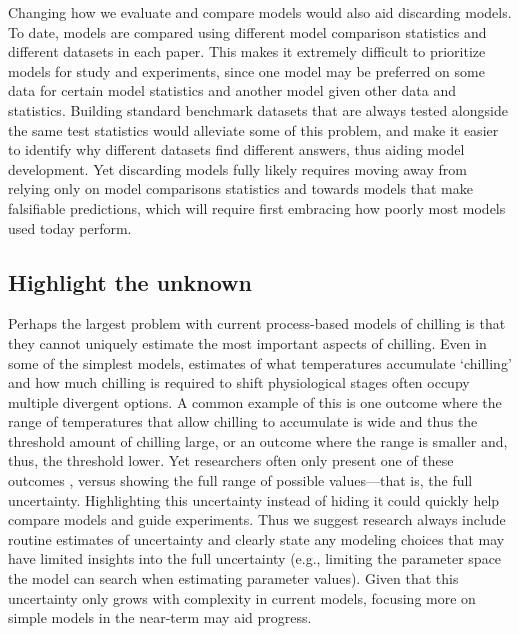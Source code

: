 \documentclass[11pt]{article}
\begin{document}
Changing how we evaluate and compare models would also aid discarding models. To date, models are compared using different model comparison statistics and different datasets in each paper. This makes it extremely difficult to prioritize models for study and experiments, since one model may be preferred on some data for certain model statistics and another model given other data and statistics. Building standard benchmark datasets that are always tested alongside the same test statistics would alleviate some of this problem, and make it easier to identify why different datasets find different answers, thus aiding model development. Yet discarding models fully likely requires moving away from relying only on model comparisons statistics and towards models that make falsifiable predictions, which will require first embracing how poorly most models used today perform. 

\subsection*{Highlight the unknown} 
Perhaps the largest problem with current process-based models of chilling is that they cannot uniquely estimate the most important aspects of chilling. Even in some of the simplest models, estimates of what temperatures accumulate `chilling' and how much chilling is required to shift physiological stages often occupy multiple divergent options. A common example of this is one outcome where the range of temperatures that allow chilling to accumulate is wide and thus the threshold amount of chilling large, or an outcome where the range is smaller and, thus, the threshold lower. Yet researchers often only present one of these outcomes \citep{chuine2016}, versus showing the full range of possible values---that is, the full uncertainty. Highlighting this uncertainty instead of hiding it could quickly help compare models and guide experiments. Thus we suggest research always include routine estimates of uncertainty and clearly state any modeling choices that may have limited insights into the full uncertainty (e.g., limiting the parameter space the model can search when estimating parameter values). Given that this uncertainty only grows with complexity in current models, focusing more on simple models in the near-term may aid progress.
\end{document}
